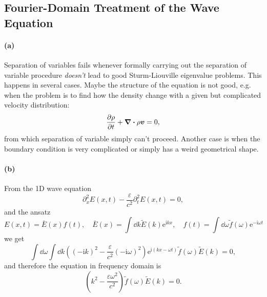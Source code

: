\documentclass[hyperref, a4paper]{article}
\newcommand*{\ii}{\mathrm{i}}
\newcommand*{\ee}{\mathrm{e}}
\begin{document}
\subsection{Fourier-Domain Treatment of the Wave Equation}

\paragraph{(a)} Separation of variables fails whenever 
formally carrying out the separation of variable procedure 
\emph{doesn't} lead to good Sturm-Liouville eigenvalue problems.
This happens in several cases.
Maybe the structure of the equation is not good, e.g. 
when the problem is to find how the density change 
with a given but complicated velocity distribution:
\begin{equation}
    \pdv{\rho}{t} + \div{\rho \vb*{v}} = 0,
\end{equation}
from which separation of variable simply can't proceed. 
Another case is when the boundary condition is very complicated 
or simply has a weird geometrical shape.

\paragraph{(b)}
From the 1D wave equation 
\begin{equation}
    \partial^2_x E(x, t) - \frac{\varepsilon}{c^2} \partial_t^2 E(x, t) = 0,
\end{equation}
and the ansatz 
\begin{equation}
    E(x, t) = \bar{E} (x) f(t), \quad 
    \bar{E}(x) = \int \dd{k} \tilde{E}(k) \ee^{\ii k x} , \quad 
    f(t) = \int \dd{\omega} \tilde{f}(\omega) \ee^{- \ii \omega t}
\end{equation}
we get 
\begin{equation}
    \int \dd{\omega} \int \dd{k}
        \left(
            (-\ii k)^2 - \frac{\varepsilon}{c^2} (- \ii \omega)^2
        \right) 
        \ee^{\ii (kx - \omega t)} \tilde{f}(\omega) \tilde{E}(k) = 0,
\end{equation}
and therefore the equation in frequency domain is 
\begin{equation}
    \left(
        k^2 - \frac{\varepsilon \omega^2}{c^2}
    \right) \tilde{f}(\omega) \tilde{E}(k) = 0. 
\end{equation}
\end{document}
